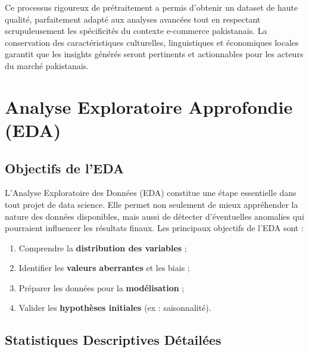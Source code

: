 \documentclass[a4paper,12pt]{article}
\begin{document}
Ce processus rigoureux de prétraitement a permis d'obtenir un dataset de haute qualité, parfaitement adapté aux analyses avancées tout en respectant scrupuleusement les spécificités du contexte e-commerce pakistanais. La conservation des caractéristiques culturelles, linguistiques et économiques locales garantit que les insights générés seront pertinents et actionnables pour les acteurs du marché pakistanais.




\section{Analyse Exploratoire Approfondie (EDA)}
\subsection{Objectifs de l'EDA}
L’Analyse Exploratoire des Données (EDA) constitue une étape essentielle dans tout projet de data science. 
Elle permet non seulement de mieux appréhender la nature des données disponibles, mais aussi de détecter 
d’éventuelles anomalies qui pourraient influencer les résultats finaux. Les principaux objectifs de l’EDA sont : 

\begin{enumerate}
    \item Comprendre la \textbf{distribution des variables} ;
    \item Identifier les \textbf{valeurs aberrantes} et les biais ;
    \item Préparer les données pour la \textbf{modélisation} ;
    \item Valider les \textbf{hypothèses initiales} (ex : saisonnalité).
\end{enumerate}
\subsection{Statistiques Descriptives Détailées}
\begin{table}[H]
\centering
{}
\caption{Statistiques descriptives du dataset pakistanais après prétraitement}
\caption*{\textit{Source : Analyse des données de la plateforme e-commerce pakistanaise, 2025}}
\label{tab:stats_descriptives}
\end{table}
\end{document}
